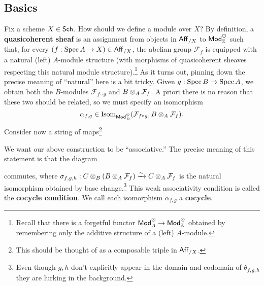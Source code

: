 \documentclass[11pt]{article}
\newcommand{\FF}{\mathcal{F}}
\begin{document}
\subsection{Basics}
Fix a scheme $X\in\operatorname{\mathsf{Sch}}$. How should we define a module over $X$? By definition, a \textbf{quasicoherent sheaf} is an assignment from objects in $\operatorname{\mathsf{Aff}}_{/X}$ to $\operatorname{\mathsf{Mod}}_{\mathbb{Z}}^{\heartsuit}$ such that, for every $(f: \operatorname{Spec} A\to X)\in\operatorname{\mathsf{Aff}}_{/X}$, the abelian group $\FF_f$ is equipped with a natural (left) $A$-module structure (with morphisms of quasicoherent sheaves respecting this natural module structure).\footnote{Recall that there is a forgetful functor $\operatorname{\mathsf{Mod}}_A^{\heartsuit}\to\operatorname{\mathsf{Mod}}_{\mathbb{Z}}^{\heartsuit}$ obtained by remembering only the additive structure of a (left) $A$-module.} As it turns out, pinning down the precise meaning of ``natural'' here is a bit tricky. Given $g: \operatorname{Spec} B\to\operatorname{Spec} A$, we obtain both the $B$-modules $\FF_{f\circ g}$ and $B\tensor_A\FF_f$. A priori there is no reason that these two should be related, so we must specify an isomorphism
$$\alpha_{f,g}\in\Isom_{\Mod_B^{\heart}}(\FF_{f\circ g},B\tensor_A\FF_f).$$
Consider now a string of maps\footnote{This should be thought of as a composable triple in $\operatorname{\mathsf{Aff}}_{/X}$.}
\begin{center}
\end{center}
We want our above construction to be ``associative.'' The precise meaning of this statement is that the diagram
\begin{center}
\end{center}
commutes, where $\sigma_{f,g,h}: C\tensor_B(B\tensor_A\FF_f)\xto{\sim}C\tensor_A\FF_f$ is the natural isomorphism obtained by base change.\footnote{Even though $g,h$ don't explicitly appear in the domain and codomain of $\theta_{f,g,h}$ they are lurking in the background.} This weak associativity condition is called the \textbf{cocycle condition}. We call each isomorphism $\alpha_{f,g}$ a \textbf{cocycle}. 
\end{document}
